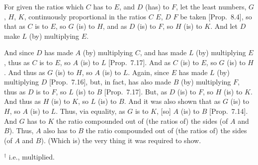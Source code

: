 \begin{Parallel}{}{}
{For given the ratios which $C$ has to $E$, and $D$ (has) to $F$, let the least numbers, $G$, $H$, $K$, continuously proportional in the
ratios $C$ $E$, $D$ $F$ be taken [Prop.~8.4], so that as $C$ is to $E$, so
$G$ (is) to $H$, and as $D$ (is) to $F$, so $H$ (is) to $K$. And let $D$ make $L$ (by) multiplying $E$. 

And since $D$ has made $A$ (by) multiplying $C$, and has made $L$ (by)
multiplying $E$, thus as $C$ is to  $E$, so $A$ (is) to $L$ [Prop.~7.17]. And as $C$ (is) to $E$, so $G$ (is) to
$H$. And thus as $G$ (is) to $H$, so $A$ (is) to $L$. Again, since
$E$ has made $L$ (by) multiplying $D$ [Prop.~7.16],
but, in fact, has also made $B$ (by) multiplying $F$, thus as $D$ is to 
$F$, so $L$ (is) to $B$  [Prop.~7.17]. But,
as $D$ (is) to $F$, so $H$ (is) to $K$.  And thus as $H$ (is) to $K$, so
$L$ (is) to $B$. And it was also shown that as $G$ (is) to $H$, so $A$ (is)
to $L$. Thus, via equality, as $G$ is to $K$, [so] $A$ (is) to $B$ [Prop.~7.14]. 
And $G$ has to $K$ the ratio compounded out of (the ratios
of) the sides (of $A$ and $B$). Thus, $A$ also has to $B$ the ratio
compounded out of (the ratios of) the sides (of $A$ and $B$). (Which is)
the very thing it was required to show.}
\end{Parallel}
{\footnotesize\noindent$^\dag$ {\rm i.e.}, multiplied.}


